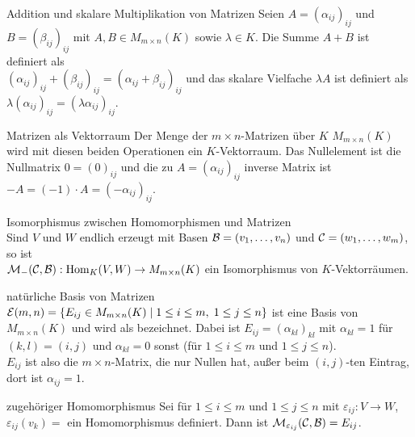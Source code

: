 \begin{Def}{Addition und skalare Multiplikation von Matrizen}
    Seien $A = (\alpha_{ij})_{ij}$ und $B = (\beta_{ij})_{ij}$ mit
    $A, B \in M_{m \times n}(K)$ sowie $\lambda \in K$.
    Die Summe $A + B$ ist definiert als \\
    $(\alpha_{ij})_{ij} + (\beta_{ij})_{ij} = (\alpha_{ij} + \beta_{ij})_{ij}$
    und das skalare Vielfache $\lambda A$ ist definiert als
    $\lambda (\alpha_{ij})_{ij} = (\lambda \alpha_{ij})_{ij}$.
\end{Def}

\begin{Satz}{Matrizen als Vektorraum}
    Der Menge der $m \times n$-Matrizen über $K$ $M_{m \times n}(K)$ wird mit
    diesen beiden Operationen ein $K$-Vektorraum.
    Das Nullelement ist die Nullmatrix $0 = (0)_{ij}$ und die zu
    $A = (\alpha_{ij})_{ij}$ inverse Matrix ist
    $-A = (-1) \cdot A = (-\alpha_{ij})_{ij}$.
\end{Satz}

\begin{Satz}{Isomorphismus zwischen Homomorphismen und Matrizen} \\
    Sind $V$ und $W$ endlich erzeugt mit Basen $\mathcal{B} = (v_1, \ldots, v_n)$
    und $\mathcal{C} = (w_1, \ldots, w_m)$, so ist \\
    $\mathcal{M}_{-}(\mathcal{C},\mathcal{B}): \operatorname{Hom}_K(V, W) \rightarrow M_{m \times n}(K)$
    ein Isomorphismus von $K$-Vektorräumen.
\end{Satz}

\begin{Def}{natürliche Basis von Matrizen}
    $\mathcal{E}(m, n) = \{E_{ij} \in M_{m \times n}(K) \;|\;
    1 \le i \le m,\; 1 \le j \le n\}$ ist eine Basis von $M_{m \times n}(K)$
    und wird als  bezeichnet.
    Dabei ist $E_{ij} = (\alpha_{kl})_{kl}$ mit $\alpha_{kl} = 1$
    für $(k, l) = (i, j)$ und $\alpha_{kl} = 0$ sonst
    (für $1 \le i \le m$ und $1 \le j \le n$). \\
    $E_{ij}$ ist also die $m \times n$-Matrix, die nur Nullen hat, außer
    beim $(i, j)$-ten Eintrag, dort ist $\alpha_{ij} = 1$.
\end{Def}

\begin{Satz}{zugehöriger Homomorphismus}
    Sei für $1 \le i \le m$ und $1 \le j \le n$ mit
    $\varepsilon_{ij}: V \rightarrow W$,
    $\varepsilon_{ij}(v_k) =$
    ein Homomorphismus definiert.
    Dann ist $\mathcal{M}_{\varepsilon_{ij}}(\mathcal{C},\mathcal{B}) = E_{ij}$.
\end{Satz}

